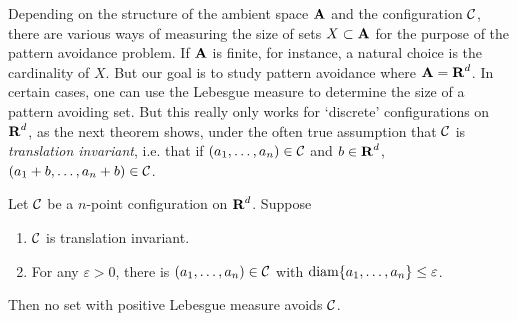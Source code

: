 Depending on the structure of the ambient space $\operatorname{\mathbf{A}}$ and the configuration $\operatorname{\mathcal{C}}$, there are various ways of measuring the size of sets $X \subset \operatorname{\mathbf{A}}$ for the purpose of the pattern avoidance problem. If $\operatorname{\mathbf{A}}$ is finite, for instance, a natural choice is the cardinality of $X$. But our goal is to study pattern avoidance where $\operatorname{\mathbf{A}} = \operatorname{\mathbf{R}}^d$. In certain cases, one can use the Lebesgue measure to determine the size of a pattern avoiding set. But this really only works for `discrete' configurations on $\operatorname{\mathbf{R}}^d$, as the next theorem shows, under the often true assumption that $\operatorname{\mathcal{C}}$ is \emph{translation invariant}, i.e. that if $(a_1, \dots, a_n) \in \operatorname{\mathcal{C}}$ and $b \in \operatorname{\mathbf{R}}^d$, $(a_1 + b, \dots, a_n + b) \in \operatorname{\mathcal{C}}$.

\begin{theorem}
	Let $\operatorname{\mathcal{C}}$ be a $n$-point configuration on $\operatorname{\mathbf{R}}^d$. Suppose
	\begin{enumerate}
		\item \label{translationinvariance} $\operatorname{\mathcal{C}}$ is translation invariant.
		\item \label{nonDiscreteConfig} For any $\varepsilon > 0$, there is $(a_1, \dots, a_n) \in \operatorname{\mathcal{C}}$ with $\operatorname{\text{diam}} \{ a_1, \dots, a_n \} \leq \varepsilon$.
	\end{enumerate}
	Then no set with positive Lebesgue measure avoids $\operatorname{\mathcal{C}}$.
\end{theorem}
